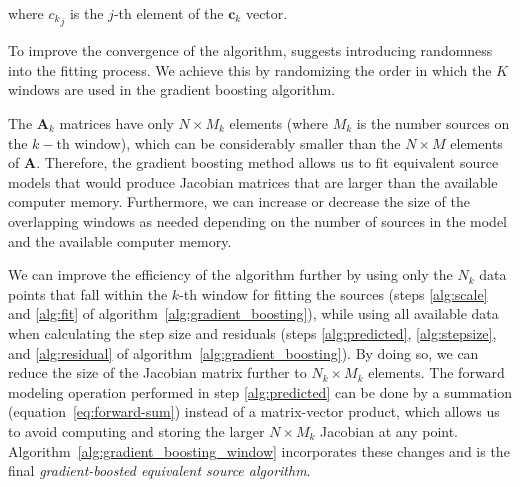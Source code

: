 \documentclass[twocolumn]{article}
\begin{document}
\noindent where ${c_k}_j$ is the $j$-th element of the $\mathbf{c}_k$ vector.

To improve the convergence of the algorithm, \citet{friedman2002} suggests
introducing randomness into the fitting process. We achieve this by randomizing
the order in which the $K$ windows are used in the gradient boosting algorithm.

The $\mathbf{A}_k$ matrices have only $N \times M_k$ elements
(where $M_k$ is the number sources on the $k-$th window), which can be
considerably smaller than the $N \times M$ elements of $\mathbf{A}$.
Therefore, the gradient boosting method allows us to fit
equivalent source models that would produce Jacobian matrices that are larger
than the available computer memory.
Furthermore, we can increase or decrease the size of the overlapping windows as
needed depending on the number of sources in the model and the available
computer memory.

We can improve the efficiency of the algorithm further by using only the $N_k$ data
points that fall within the $k$-th window for fitting the sources
(steps \ref{alg:scale} and \ref{alg:fit} of
algorithm~\ref{alg:gradient_boosting}),
while using all available data when calculating the step size and residuals
(steps \ref{alg:predicted}, \ref{alg:stepsize}, and \ref{alg:residual}
of algorithm~\ref{alg:gradient_boosting}).
By doing so, we can reduce the size of the Jacobian matrix further to $N_k
\times M_k$ elements.
The forward modeling operation performed in step \ref{alg:predicted} can be
done by a summation (equation~\ref{eq:forward-sum})
instead of a matrix-vector product, which allows us to avoid computing and
storing the larger $N \times M_k$ Jacobian at any point.
Algorithm~\ref{alg:gradient_boosting_window} incorporates these changes and is
the final \textit{gradient-boosted equivalent source algorithm}.
\end{document}

